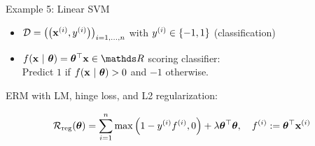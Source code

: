 \documentclass[11pt,compress,t,notes=noshow, xcolor=table]{beamer}
\begin{document}
\begin{vbframe}{Example 5: Linear SVM}

\begin{itemize}
	\item $\mathcal{D} = \left(\left(\mathbf{x}^{(i)}, y^{(i)}\right)\right)_{i = 1, ..., n}$ with $y^{(i)} \in \{-1, 1\}$ (classification)
	\item $\fxt = \thetab^\top \xv \in \R$ scoring classifier:\\
 Predict $1$ if $f(\mathbf{x} ~|~ \bm{\theta}) > 0$ and $-1$ otherwise. 
\end{itemize}
\vspace*{0.2cm}
ERM with LM, hinge loss, and L2 regularization: 

$$
	\mathcal{R}_{\text{reg}}(\bm{\theta}) = \sum\limits_{i=1}^n \max\left(1 - y^{(i)} f^{(i)}, 0\right) + \lambda \bm{\theta}^\top \bm{\theta}, \quad f^{(i)} := \bm{\theta}^\top \mathbf{x}^{(i)}
$$

\vspace*{-0.2cm}


\end{vbframe}
\end{document}
